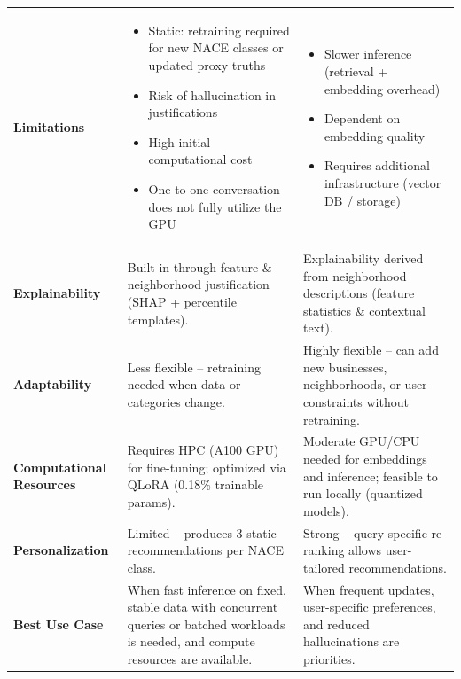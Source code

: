 \begin{longtable}{>{\bfseries}p{} Y Y}
    Limitations
    & \begin{itemize}[leftmargin=*, nosep]
        \item Static: retraining required for new NACE classes or updated proxy truths
        \item Risk of hallucination in justifications
        \item High initial computational cost
        \item One-to-one conversation does not fully utilize the GPU
      \end{itemize}
    & \begin{itemize}[leftmargin=*, nosep]
        \item Slower inference (retrieval {+} embedding overhead)
        \item Dependent on embedding quality
        \item Requires additional infrastructure (vector DB / storage)
      \end{itemize} \\
    
    Explainability
    & Built-in through feature \& neighborhood justification (SHAP {+} percentile templates).
    & Explainability derived from neighborhood descriptions (feature statistics \& contextual text). \\
    
    Adaptability
    & Less flexible -- retraining needed when data or categories change.
    & Highly flexible -- can add new businesses, neighborhoods, or user constraints without retraining. \\
    
    Computational Resources
    & Requires HPC (A100 GPU) for fine-tuning; optimized via QLoRA (0.18\% trainable params).
    & Moderate GPU/CPU needed for embeddings and inference; feasible to run locally (quantized models). \\
    
    Personalization
    & Limited -- produces 3 static recommendations per NACE class.
    & Strong -- query-specific re-ranking allows user-tailored recommendations. \\
    
    Best Use Case
    & When fast inference on fixed, stable data with concurrent queries or batched workloads is needed, and compute resources are available.
    & When frequent updates, user-specific preferences, and reduced hallucinations are priorities. \\
    
\end{longtable}


